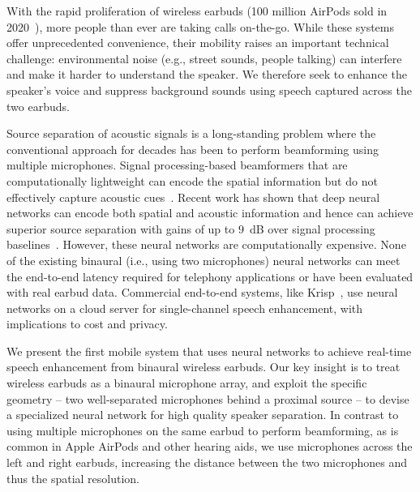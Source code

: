 \documentclass [11pt, proquest] {uwthesis}[2020/02/24]
\begin{document}
With the rapid proliferation of wireless earbuds (100 million AirPods sold in 2020~\cite{airpodssales}), more people than ever are taking calls on-the-go.  While these systems offer unprecedented convenience, their mobility raises an important technical challenge:  environmental noise (e.g., street sounds, people talking)  can interfere and make it harder to understand the speaker.
We therefore seek to enhance the speaker's voice and suppress background sounds using speech captured across the two earbuds. 


Source separation of acoustic signals  is a long-standing problem where the conventional approach for decades has been to perform beamforming using multiple microphones. Signal processing-based beamformers that are computationally lightweight can encode the spatial information  but do not effectively capture acoustic cues~\cite{van1988beamforming,krim1996two,chhetri2018multichannel}.  Recent work has shown that deep neural networks can encode both spatial and acoustic information and hence can  achieve superior source separation  with gains of up to $9$~dB over signal processing baselines~\cite{subakan2021attention,luo2019conv}. However, these neural networks are computationally expensive. None of the existing binaural (i.e., using two microphones) neural networks can  meet the end-to-end latency required for telephony applications or have been evaluated with real earbud data. Commercial end-to-end systems, like  Krisp~\cite{krisp}, use neural networks on a cloud server for single-channel  speech enhancement, with implications to  cost and privacy. %


We present the first mobile system that uses neural networks to achieve real-time speech enhancement from binaural wireless earbuds.
Our key insight is to treat wireless earbuds as a binaural microphone array,
and exploit the specific geometry -- two well-separated microphones behind a proximal source -- to devise a specialized neural network for high quality speaker separation. In contrast to using multiple microphones on the same earbud to perform beamforming, as is common in Apple AirPods \cite{airpods} and other hearing aids, we use microphones across the left and right earbuds, increasing the distance between the two microphones and thus the spatial resolution. 
\end{document}
